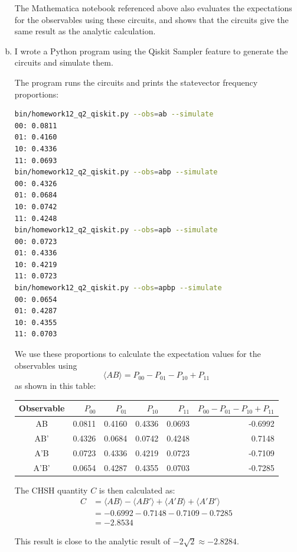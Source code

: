 \documentclass[12pt]{extarticle}
\begin{document}
\begin{enumerate}[(a)]
The Mathematica notebook referenced above also evaluates the expectations for the observables using these circuits,
and shows that the circuits give the same result as the analytic calculation.

\item

I wrote a Python program using the Qiskit Sampler feature to generate the circuits and simulate them.

The program runs the circuits and prints the statevector frequency proportions:

\begin{lstlisting}[language=bash]
bin/homework12_q2_qiskit.py --obs=ab --simulate
00: 0.0811
01: 0.4160
10: 0.4336
11: 0.0693
bin/homework12_q2_qiskit.py --obs=abp --simulate
00: 0.4326
01: 0.0684
10: 0.0742
11: 0.4248
bin/homework12_q2_qiskit.py --obs=apb --simulate
00: 0.0723
01: 0.4336
10: 0.4219
11: 0.0723
bin/homework12_q2_qiskit.py --obs=apbp --simulate
00: 0.0654
01: 0.4287
10: 0.4355
11: 0.0703
\end{lstlisting}

We use these proportions to calculate the expectation values for the observables using
\[
\langle AB \rangle = P_{00} - P_{01} - P_{10} + P_{11}
\]
as shown in this table:

\begin{center}
\begin{tabular}{|c|r|r|r|r|r|}
\hline
Observable & $P_{00}$ & $P_{01}$ & $P_{10}$ & $P_{11}$ & $P_{00} - P_{01} - P_{10} + P_{11}$ \\
\hline
AB   & 0.0811 & 0.4160 & 0.4336 & 0.0693 & -0.6992 \\
AB'  & 0.4326 & 0.0684 & 0.0742 & 0.4248 &  0.7148 \\
A'B  & 0.0723 & 0.4336 & 0.4219 & 0.0723 & -0.7109 \\
A'B' & 0.0654 & 0.4287 & 0.4355 & 0.0703 & -0.7285 \\
\hline
\end{tabular}
\end{center}

The CHSH quantity $C$ is then calculated as:
\begin{align*}
C & = \langle AB \rangle - \langle AB' \rangle + \langle A'B \rangle + \langle A'B' \rangle \\
& = -0.6992 - 0.7148 - 0.7109 - 0.7285 \\
& = -2.8534
\end{align*}

This result is close to the analytic result of $-2\sqrt{2} \approx -2.8284$.


\end{enumerate}
\end{document}
